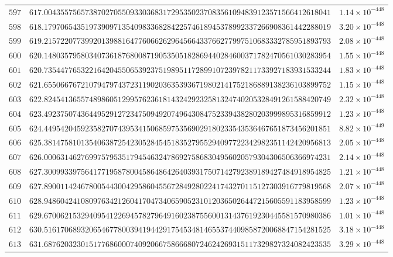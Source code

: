 \documentclass[12pt,reqno]{amsart}
\theoremstyle{remark}
\begin{document}
\begin{longtable}{clc}
$597$ & $617.0043557565738702705509330368317295350237083561094839123571566412618041$ & $1.14\times 10^{-448}$ \\
$598$ & $618.1797065435197390971354098336828422574618945378992337266908361442288019$ & $3.20\times 10^{-448}$ \\
$599$ & $619.2157220773992013988164776066262964566433766277997510683332785951893793$ & $2.08\times 10^{-448}$ \\
$600$ & $620.1480357958034073618768008719053505182869440284600371782470561030283954$ & $1.55\times 10^{-448}$ \\
$601$ & $620.7354477653221642045506539237519895117289910723978211733927183931533244$ & $1.83\times 10^{-448}$ \\
$602$ & $621.6550667672107947974372311902036353936719802141752186889138236103899752$ & $1.15\times 10^{-448}$ \\
$603$ & $622.8245413655748986051299576236181432429232581324740205328491261588420749$ & $2.32\times 10^{-448}$ \\
$604$ & $623.4923750743644952912723475094920749643084752339438280203999895316859912$ & $1.23\times 10^{-448}$ \\
$605$ & $624.4495420459235827074395341506859753569029180233543536467651873456201851$ & $8.82\times 10^{-449}$ \\
$606$ & $625.3814758101354063872542305284545183527955294097722342982351142420956813$ & $2.05\times 10^{-448}$ \\
$607$ & $626.0006314627699757953517945463247869275868304956020579304306506366974231$ & $2.14\times 10^{-448}$ \\
$608$ & $627.3009933975641771958780045864864264039317507142792389189427484918954825$ & $1.21\times 10^{-448}$ \\
$609$ & $627.8900114246780054430042958604556728492802241743270115127303916779819568$ & $2.07\times 10^{-448}$ \\
$610$ & $628.9486042410809763421260417047340659052310120365026447215605591183958599$ & $1.23\times 10^{-448}$ \\
$611$ & $629.6700621532940954122694578279649160238755600131437619230445581570980386$ & $1.01\times 10^{-448}$ \\
$612$ & $630.5161706893206546778003941944291754534814655374409858720068847154281525$ & $3.18\times 10^{-448}$ \\
$613$ & $631.6876203230151776860007409206675866680724624269315117329827324082423535$ & $3.29\times 10^{-448}$ \\

\end{longtable}
\end{document}
